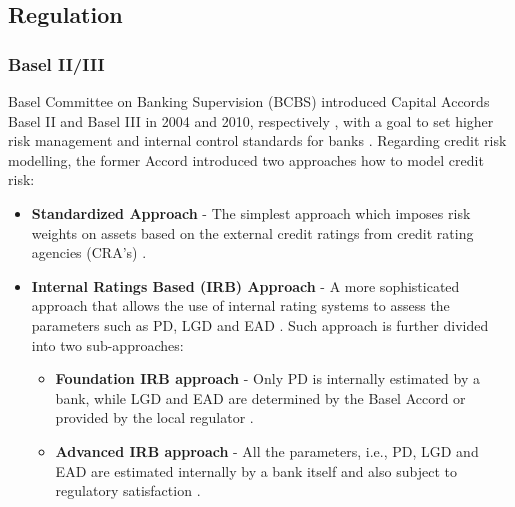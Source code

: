 \subsection{Regulation}
\subsubsection{Basel II/III}
Basel Committee on Banking Supervision (BCBS) introduced Capital Accords Basel II and Basel III in 2004 and 2010, respectively \citep{shakdwipee2017basel}, with a goal to set higher risk management and internal control standards for banks \citep{witzany2017credit}.
Regarding credit risk modelling, the former Accord introduced two approaches how to model credit risk:
\begin{itemize}\setlength\itemsep{0em}
    \item \textbf{Standardized Approach} - The simplest approach which imposes risk weights on assets based on the external credit ratings from credit rating agencies (CRA's) \citep{konno2016alternative}.
    \item \textbf{Internal Ratings Based (IRB)  Approach} - A more sophisticated approach that allows the use of internal rating systems to assess the parameters such as PD, LGD and EAD \citep{baesens2016credit}. Such approach is further divided into two sub-approaches:
    \begin{itemize}\setlength\itemsep{0em}
        \item \textbf{Foundation IRB approach} - Only PD is internally estimated by a bank, while LGD and EAD are determined by the Basel Accord or provided by the local regulator \citep{baesens2016credit}.
        \item \textbf{Advanced IRB approach} - All the parameters, i.e., PD, LGD and EAD are estimated internally by a bank itself and also subject to regulatory satisfaction \citep{joseph2013advanced}.
    \end{itemize}
\end{itemize}

